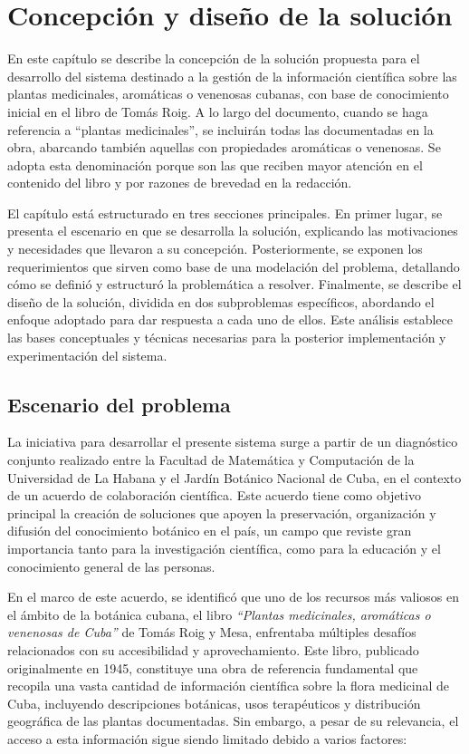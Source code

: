 \chapter{Concepción y diseño de la solución}\label{chapter:solutionDesign}
En este capítulo se describe la concepción de la solución propuesta para el desarrollo 
del sistema destinado a la gestión de la información científica sobre las 
plantas medicinales, aromáticas o venenosas cubanas, con base de conocimiento inicial en el libro de Tomás Roig.
A lo largo del documento, cuando se haga referencia a ``plantas medicinales'', se incluirán todas las documentadas en 
la obra, abarcando también aquellas con propiedades aromáticas o venenosas. Se adopta esta denominación porque 
son las que reciben mayor atención en el contenido del libro y por razones de brevedad en la redacción.

El capítulo está estructurado en tres secciones principales.
En primer lugar, se presenta el escenario en que se desarrolla la solución, 
explicando las motivaciones y necesidades que llevaron a su concepción. 
Posteriormente, se exponen los requerimientos que sirven como base de una modelación del problema, 
detallando cómo se definió y estructuró la problemática a resolver. 
Finalmente, se describe el diseño de la solución, dividida en dos subproblemas específicos, 
abordando el enfoque adoptado para dar respuesta a cada uno de ellos. 
Este análisis establece las bases conceptuales y técnicas necesarias para la 
posterior implementación y experimentación del sistema.



\section{Escenario del problema}
La iniciativa para desarrollar el presente sistema surge a partir de un diagnóstico 
conjunto realizado entre la Facultad de Matemática y Computación de la Universidad de La Habana y el Jardín Botánico Nacional de Cuba, 
en el contexto de un acuerdo de colaboración científica. 
Este acuerdo tiene como objetivo principal la creación de soluciones que apoyen 
la preservación, organización y difusión del conocimiento botánico en el país, 
un campo que reviste gran importancia tanto para la investigación científica, 
como para la educación y el conocimiento general de las personas.

En el marco de este acuerdo, se identificó que uno de los recursos más valiosos 
en el ámbito de la botánica cubana, el libro \textit{``Plantas medicinales, aromáticas o venenosas de Cuba''} 
de Tomás Roig y Mesa, enfrentaba múltiples desafíos relacionados con su accesibilidad y 
aprovechamiento. Este libro, publicado originalmente en 1945, constituye una obra 
de referencia fundamental que recopila una vasta cantidad de información científica 
sobre la flora medicinal de Cuba, incluyendo descripciones botánicas, 
usos terapéuticos y distribución geográfica de las plantas documentadas. 
Sin embargo, a pesar de su relevancia, el acceso a esta información sigue siendo 
limitado debido a varios factores:

